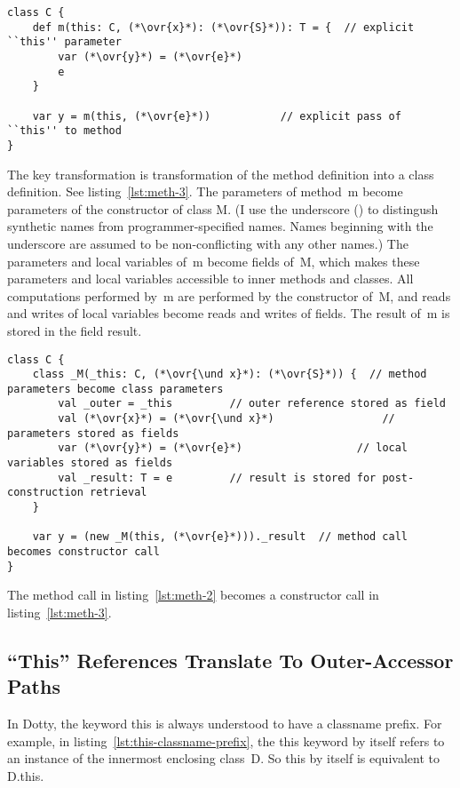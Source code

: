 \begin{lstlisting}[float=htbp, caption={Method Transformation 2 (Explicit This)}, label={lst:meth-2}]
class C {
	def m(this: C, (*\ovr{x}*): (*\ovr{S}*)): T = {  // explicit ``this'' parameter
		var (*\ovr{y}*) = (*\ovr{e}*)
		e
	}

	var y = m(this, (*\ovr{e}*))           // explicit pass of ``this'' to method
}
\end{lstlisting}

The key transformation is transformation of the method definition into a class definition. See listing~\ref{lst:meth-3}.
The parameters of method~{\cd m} become parameters of the constructor of class {\cd \und M}. (I use the underscore \mbox{({\cd \und})} to distingush synthetic names from programmer-specified names. Names beginning with the underscore are assumed to be non-conflicting with any other names.)
The parameters and local variables of~{\cd m} become fields of~{\cd \und M}, which makes these parameters and local variables accessible to inner methods and classes.
All computations performed by~{\cd m} are performed by the constructor of~{\cd \und M}, and reads and writes of local variables become reads and writes of fields.
The result of~{\cd m} is stored in the field {\cd \und result}.

\begin{lstlisting}[float=htbp, caption={Method Transformation 3 (Closure)}, label={lst:meth-3}]
class C {
	class _M(_this: C, (*\ovr{\und x}*): (*\ovr{S}*)) {  // method parameters become class parameters
		val _outer = _this         // outer reference stored as field
		val (*\ovr{x}*) = (*\ovr{\und x}*)                 // parameters stored as fields
		var (*\ovr{y}*) = (*\ovr{e}*)                  // local variables stored as fields
		val _result: T = e         // result is stored for post-construction retrieval
	}

	var y = (new _M(this, (*\ovr{e}*)))._result  // method call becomes constructor call
}
\end{lstlisting}

The method call in listing~\ref{lst:meth-2} becomes a constructor call in listing~\ref{lst:meth-3}. 

% 

\subsection{``This'' References Translate To Outer-Accessor Paths}

In Dotty, the keyword {\cd this} is always understood to have a classname prefix. For example, in listing~\ref{lst:this-classname-prefix}, the {\cd this} keyword by itself refers to an instance of the innermost enclosing class~{\cd D}. So {\cd this} by itself is equivalent to \mbox{\cd D.this}.

